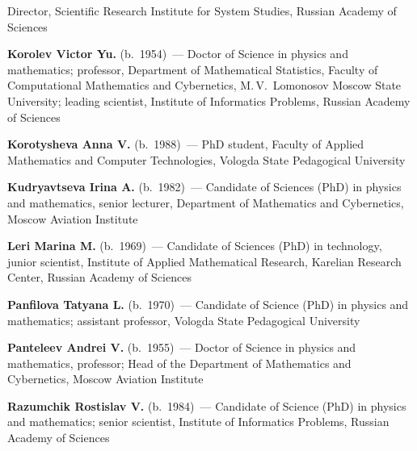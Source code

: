 \begin{multicols}{2}
\noindent
 Director, Scientific Research Institute 
for System Studies, Russian Academy of Sciences

\vspace*{7pt}

\noindent
\textbf{Korolev Victor Yu.}  (b.\ 1954)~--- Doctor of Science in physics and mathematics;
professor, Department of Mathematical Statistics, 
Faculty of Computational Mathematics and Cybernetics, M.\,V.~Lomonosov Moscow State University;
leading scientist, Institute of Informatics Problems, Russian Academy of Sciences

\vspace*{6pt}

\noindent
\textbf{Korotysheva Anna V.} (b.\ 1988)~--- PhD student, Faculty of Applied
Mathematics and Computer Technologies, Vologda State Pedagogical University


\vspace*{6pt}

\noindent
\textbf{Kudryavtseva Irina A.} (b.\ 1982)~--- Candidate of Sciences (PhD) 
in physics and mathematics, senior lecturer, 
Department of Mathematics and Cybernetics, Moscow Aviation Institute


\vspace*{6pt}

\noindent
\textbf{Leri Marina M.} (b.\ 1969)~--- Candidate of Sciences (PhD) in 
technology, junior scientist, Institute of Applied Mathematical Research, 
Karelian Research Center, Russian Academy of Sciences

\vspace*{6pt}

\noindent
\textbf{Panfilova Tatyana L.} (b.\ 1970)~--- Candidate of Science (PhD) in physics and mathematics; 
assistant professor, Vologda State Pedagogical University

\vspace*{6pt}

\noindent 
\textbf{Panteleev Andrei V.} (b.\ 1955)~--- Doctor of Science in physics and mathematics, 
professor; Head of the Department of Mathematics and Cybernetics, Moscow Aviation Institute

\vspace*{6pt}

\noindent
\textbf{Razumchik Rostislav V.} (b.\ 1984)~--- Candidate of Science (PhD) in 
physics and mathematics; 
senior scientist, Institute of Informatics Problems, Russian Academy of Sciences

\vspace*{6pt}



\end{multicols}
